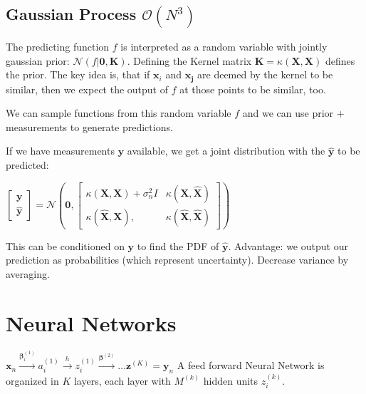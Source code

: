\documentclass[10pt,a4paper,landscape]{article}
\renewcommand{\bf}[1]{\ensuremath{\mathbf{#1}}}
\newcommand{\bbeta}{\boldsymbol\beta}
\begin{document}
\begin{multicols*}{4}
\subsection{Gaussian Process \small$\mathcal{O}(N^3)$}
The predicting function $f$ is interpreted as a random variable with jointly gaussian prior: $\mathcal{N}(f | \bf{0}, \bf{K})$.
Defining the Kernel matrix $\bf{K} = \kappa(\bf{X}, \bf{X})$ defines the prior. The key idea is, that if $\bf{x}_i$ and $\bf{x_j}$ are
deemed by the kernel to be similar, then we expect the output of $f$ at those points to be similar, too.

We can sample functions from this random variable $f$ and we can use prior + measurements to generate predictions.

If we have measurements $\bf{y}$ available, we get a joint distribution with the $\bf{\hat{y}}$ to be predicted:

$
\begin{bmatrix}
  \bf{y} \\
  \bf{\hat{y}}
\end{bmatrix}
=
\mathcal{N} \left(
  \bf{0},
  \begin{bmatrix}
    \kappa(\bf{X}, \bf{X}) + \sigma_n^2 I  & \kappa(\bf{X}, \bf{\hat{X}}) \\
    \kappa(\bf{\hat{X}}, \bf{X}),          & \kappa(\bf{\hat{X}}, \bf{\hat{X}})
  \end{bmatrix}
\right)
$

This can be conditioned on $\bf{y}$ to find the PDF of $\bf{\hat{y}}$. Advantage: we output our prediction as probabilities (which represent uncertainty).
Decrease variance by averaging.

\section{Neural Networks}
$\bf{x}_n \xrightarrow{\bbeta_i^{(1)}} a_i^{(1)} \xrightarrow{h} z_i^{(1)} \xrightarrow{\bbeta^{(2)}} \dots \bf{z}^{(K)} = \bf{y}_n$
A feed forward Neural Network is organized in $K$ layers, each layer with $M^{(k)}$ hidden units $z_i^{(k)}$. %


\end{multicols*}
\end{document}
